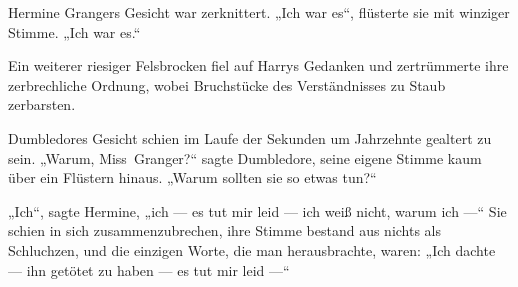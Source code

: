Hermine Grangers Gesicht war zerknittert.
„Ich war es“, flüsterte sie mit winziger Stimme.
„Ich war es.“

Ein weiterer riesiger Felsbrocken fiel auf Harrys Gedanken und zertrümmerte ihre zerbrechliche Ordnung, wobei Bruchstücke des Verständnisses zu Staub zerbarsten.

Dumbledores Gesicht schien im Laufe der Sekunden um Jahrzehnte gealtert zu sein.
„Warum, Miss~Granger?“ sagte Dumbledore, seine eigene Stimme kaum über ein Flüstern hinaus.
„Warum sollten sie so etwas tun?“

„Ich“, sagte Hermine, „ich — es tut mir leid — ich weiß nicht, warum ich —“ Sie schien in sich zusammenzubrechen, ihre Stimme bestand aus nichts als Schluchzen, und die einzigen Worte, die man herausbrachte, waren:
„Ich dachte — ihn getötet zu haben — es tut mir leid —“


